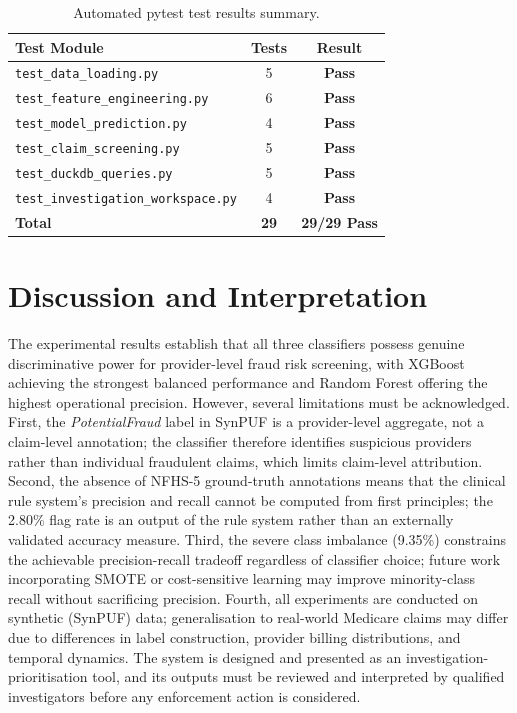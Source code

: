 \begin{table}[htbp]
\centering
\caption{Automated pytest test results summary.}
\label{tab:tests}
\begin{tabular}{@{}lcc@{}}
\toprule
\textbf{Test Module} & \textbf{Tests} & \textbf{Result} \\
\midrule
\texttt{test\_data\_loading.py}             & 5  & \textbf{Pass} \\
\texttt{test\_feature\_engineering.py}     & 6  & \textbf{Pass} \\
\texttt{test\_model\_prediction.py}        & 4  & \textbf{Pass} \\
\texttt{test\_claim\_screening.py}         & 5  & \textbf{Pass} \\
\texttt{test\_duckdb\_queries.py}          & 5  & \textbf{Pass} \\
\texttt{test\_investigation\_workspace.py} & 4  & \textbf{Pass} \\
\midrule
\textbf{Total}                             & \textbf{29} & \textbf{29/29 Pass} \\
\bottomrule
\end{tabular}
\end{table}

\section{Discussion and Interpretation}
\label{sec:discussion}

The experimental results establish that all three classifiers possess genuine discriminative power for provider-level fraud risk screening, with XGBoost achieving the strongest balanced performance and Random Forest offering the highest operational precision. However, several limitations must be acknowledged. First, the \textit{PotentialFraud} label in SynPUF is a provider-level aggregate, not a claim-level annotation; the classifier therefore identifies suspicious providers rather than individual fraudulent claims, which limits claim-level attribution. Second, the absence of NFHS-5 ground-truth annotations means that the clinical rule system's precision and recall cannot be computed from first principles; the 2.80\% flag rate is an output of the rule system rather than an externally validated accuracy measure. Third, the severe class imbalance (9.35\%) constrains the achievable precision-recall tradeoff regardless of classifier choice; future work incorporating SMOTE \cite{b3} or cost-sensitive learning may improve minority-class recall without sacrificing precision. Fourth, all experiments are conducted on synthetic (SynPUF) data; generalisation to real-world Medicare claims may differ due to differences in label construction, provider billing distributions, and temporal dynamics. The system is designed and presented as an investigation-prioritisation tool, and its outputs must be reviewed and interpreted by qualified investigators before any enforcement action is considered.
